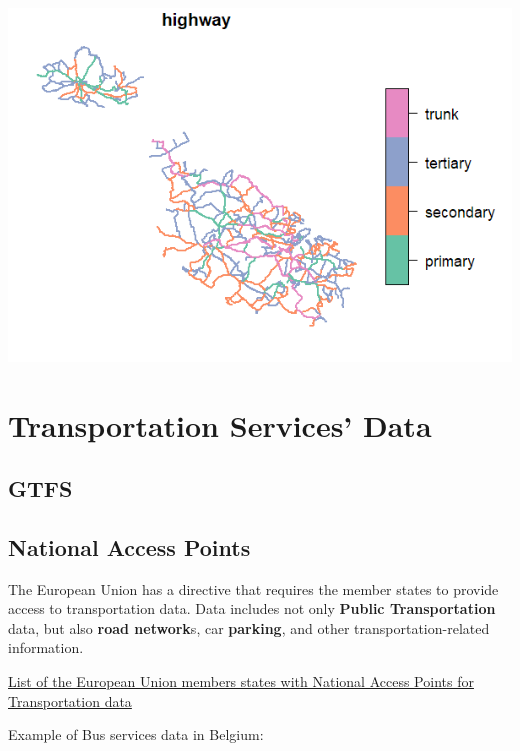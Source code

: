 \documentclass[
  letterpaper,
  DIV=11,
  numbers=noendperiod]{scrreprt}
\begin{document}
\begin{center}
\includegraphics{images/malta_roads.png}
\end{center}

\section{Transportation Services'
Data}\label{transportation-services-data}

\subsection{GTFS}\label{gtfs}

\subsection{National Access Points}\label{national-access-points}

The European Union has a directive that requires the member states to
provide access to transportation data. Data includes not only
\textbf{Public Transportation} data, but also \textbf{road network}s,
car \textbf{parking}, and other transportation-related information.

\href{https://transport.ec.europa.eu/transport-themes/smart-mobility/road/its-directive-and-action-plan/national-access-points_en}{List
of the European Union members states with National Access Points for
Transportation data}

Example of Bus services data in Belgium:
\end{document}
